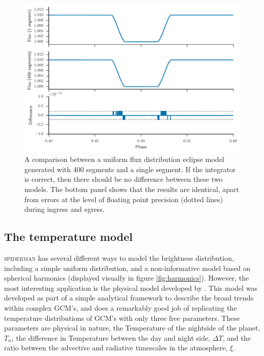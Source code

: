 \documentclass[a4paper,fleqn,usenatbib]{mnras}
\begin{document}
\begin{figure}
\begin{center}
\includegraphics[width=\columnwidth]{img/precision.pdf}
\caption{A comparison between a uniform flux distribution eclipse model generated with 400 segments and a single segment. If the integrator is correct, then there should be no difference between these two models. The bottom panel shows that the results are identical, apart from errors at the level of floating point precision (dotted lines) during ingress and egress.}
\label{fig:precision}
\end{center}
\end{figure}

\subsection{The temperature model}\label{sec:temp model}

\textsc{spiderman} has several different ways to model the brightness distribution, including a simple uniform distribution, and a non-informative model based on spherical harmonics (displayed visually in figure \ref{fig:harmonics}). However, the most interesting application is the physical model developed by \citet{Zhang2016}. This model was developed as part of a simple analytical framework to describe the broad trends within complex GCM's, and does a remarkably good job of replicating the temperature distributions of GCM's with only three free parameters. These parameters are physical in nature, the Temperature of the nightside of the planet, $T_n$, the difference in Temperature between the day and night side, $\Delta T$, and the ratio between the advective and radiative timescales in the atmosphere, $\xi$.
\end{document}
